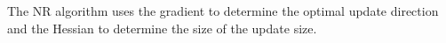 \tftrue 

The NR algorithm uses the gradient to determine the optimal update direction and the Hessian to determine the size of the update size. 